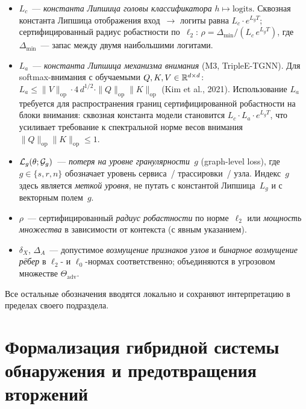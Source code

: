 \begin{itemize}[leftmargin=2em, itemsep=0.2em]
\item $L_c$~--- \emph{константа Липшица головы классификатора}
$h\mapsto\mathrm{logits}$. Сквозная константа Липшица отображения
вход~$\to$ логиты равна $L_c\cdot e^{L_g T}$; сертифицированный
радиус робастности по~$\ell_2$:
$\rho=\Delta_{\min}/(L_c\,e^{L_g T})$, где $\Delta_{\min}$~---
запас между двумя наибольшими логитами.

\item $L_a$~--- \emph{константа Липшица механизма внимания}
(M3, TripleE-TGNN). Для softmax-внимания с обучаемыми
$Q,K,V\in\mathbb{R}^{d\times d}$: $L_a\le
\|V\|_{\mathrm{op}}\cdot 4\,d^{1/2}\cdot
\|Q\|_{\mathrm{op}}\|K\|_{\mathrm{op}}$ (Kim et al., 2021).
Использование $L_a$ требуется для распространения границ
сертифицированной робастности на блоки внимания: сквозная
константа модели становится $L_c\cdot L_a\cdot e^{L_g T}$,
что усиливает требование к спектральной норме весов внимания
$\|Q\|_{\mathrm{op}}\|K\|_{\mathrm{op}}\le 1$.

\item $\mathcal{L}_g(\theta;\mathcal{G}_g)$~--- \emph{потеря на уровне
гранулярности~$g$} (graph-level loss), где $g\in\{s,r,n\}$
обозначает уровень сервиса~/ трассировки~/ узла. Индекс~$g$
здесь является \emph{меткой уровня}, не путать с константой
Липшица~$L_g$ и с векторным полем~$g$.

\item $\rho$~--- сертифицированный \emph{радиус робастности}
по норме~$\ell_2$ или \emph{мощность множества} в зависимости
от контекста (с явным указанием).

\item $\delta_X$, $\Delta_A$~--- допустимое \emph{возмущение
признаков узлов} и \emph{бинарное возмущение рёбер} в
$\ell_2$- и $\ell_0$-нормах соответственно; объединяются в
угрозовом множестве $\Theta_{\mathrm{adv}}$.

\end{itemize}

\noindent Все остальные обозначения вводятся локально и
сохраняют интерпретацию в пределах своего подраздела.

\section{Формализация гибридной системы обнаружения и предотвращения вторжений}
\label{sec:hybrid_idps_math_model}

